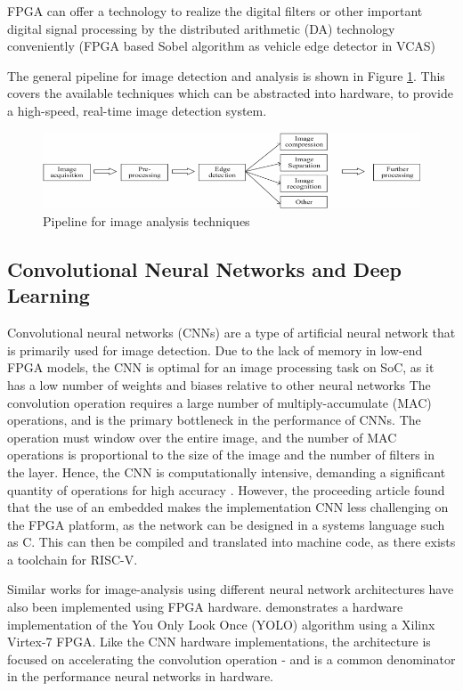 FPGA can offer a technology to realize the digital filters or other important digital signal processing by the distributed arithmetic (DA) technology conveniently (FPGA based Sobel algorithm as vehicle edge detector in VCAS)

The general pipeline for image detection and analysis is shown in Figure \ref{fig:pipeline}. This covers the available techniques which can be abstracted into hardware, to provide a high-speed, real-time image detection system.
\begin{figure}[h]
    \centering
    \includegraphics[width=1\textwidth]{Assets/Pipeline.png}
    \caption{Pipeline for image analysis techniques \cite{RTEdge}}
    \label{fig:pipeline}
\end{figure}


\subsection{Convolutional Neural Networks and Deep Learning}
Convolutional neural networks (CNNs) are a type of artificial neural network that is primarily used for image detection.
Due to the lack of memory in low-end FPGA models, the CNN is optimal for an image processing task on SoC, as it has a low number of weights and biases relative to other neural networks \cite{Drowsiness}
The convolution operation requires a large number of multiply-accumulate (MAC) operations, and is the primary bottleneck in the performance of CNNs.
The operation must window over the entire image, and the number of MAC operations is proportional to the size of the image and the number of filters in the layer.
Hence, the CNN is computationally intensive, demanding a significant quantity of operations for high accuracy \cite{Linear}.
However, the proceeding \cite{Drowsiness} article found that the use of an embedded makes the implementation CNN less challenging on the FPGA platform, as the network can be designed in a systems language such as C.
This can then be compiled and translated into machine code, as there exists a toolchain for RISC-V.

Similar works for image-analysis using different neural network architectures have also been implemented using FPGA hardware.
\cite{Yolo} demonstrates a hardware implementation of the You Only Look Once (YOLO) algorithm using a Xilinx Virtex-7 FPGA. 
Like the CNN hardware implementations, the architecture is focused on accelerating the convolution operation - and is a common denominator in the performance neural networks in hardware.

